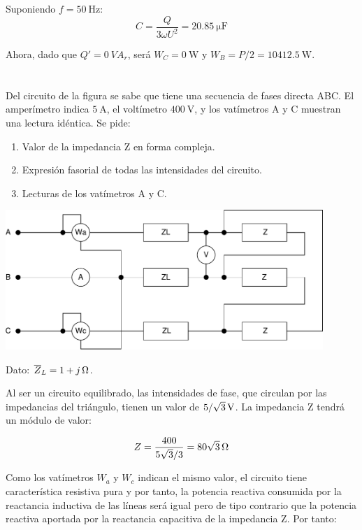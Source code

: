 \documentclass[12pt]{article}
\begin{document}
Suponiendo $f = \SI{50}{\hertz}$:
\[
  C = \frac{Q}{3 \omega U^2} = \SI{20.85}{\micro\farad}
\]

Ahora, dado que $Q' = \SI{0}{VA}_r$, será $W_C = \SI{0}{\watt}$ y
$W_B = P/2 = \SI{10412.5}{\watt}$.

\clearpage

\section{}

Del circuito de la figura se sabe que tiene una secuencia de fases
directa ABC. El amperímetro indica $\SI{5}{\ampere}$, el voltímetro
$\SI{400}{\volt}$, y los vatímetros A y C muestran una lectura
idéntica. Se pide:

\begin{enumerate}
\item Valor de la impedancia Z en forma compleja.
\item Expresión fasorial de todas las intensidades del circuito.
\item Lecturas de los vatímetros A y C.
\end{enumerate}

\begin{center}
  \includegraphics[width = 0.9\textwidth]{figs/trifasica}
\end{center}

Dato: $\overline{Z}_L = \SI[parse-numbers = false]{1 + j}{\ohm}$.

\noindent\hrulefill

Al ser un circuito equilibrado, las intensidades de fase, que
circulan por las impedancias del triángulo, tienen un valor de
$\SI[parse-numbers=false]{5/\sqrt{3}}{\volt}$. La impedancia Z
tendrá un módulo de valor:

\[
  Z = \frac{400}{5\sqrt{3}/3} =
  \SI[parse-numbers=false]{80\sqrt{3}}{\ohm}
\]

Como los vatímetros $W_a$ y $W_c$ indican el mismo valor, el
circuito tiene característica resistiva pura y por tanto, la
potencia reactiva consumida por la reactancia inductiva de las
líneas será igual pero de tipo contrario que la potencia reactiva
aportada por la reactancia capacitiva de la impedancia Z. Por tanto:
\end{document}
